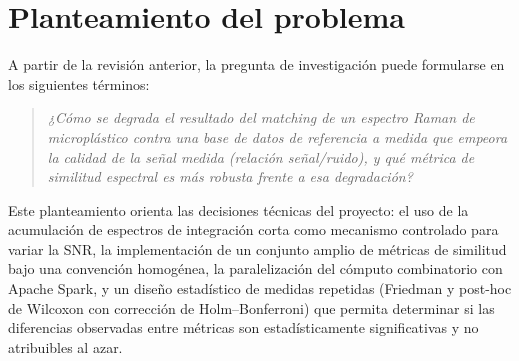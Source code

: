 \section{Planteamiento del problema}

A partir de la revisión anterior, la pregunta de investigación puede formularse en los siguientes términos:

\begin{quote}
\textit{¿Cómo se degrada el resultado del \textit{matching} de un espectro Raman de microplástico contra una base de datos de referencia a medida que empeora la calidad de la señal medida (relación señal/ruido), y qué métrica de similitud espectral es más robusta frente a esa degradación?}
\end{quote}

Este planteamiento orienta las decisiones técnicas del proyecto: el uso de la acumulación de espectros de integración corta como mecanismo controlado para variar la SNR, la implementación de un conjunto amplio de métricas de similitud bajo una convención homogénea, la paralelización del cómputo combinatorio con Apache Spark, y un diseño estadístico de medidas repetidas (Friedman y post-hoc de Wilcoxon con corrección de Holm--Bonferroni) que permita determinar si las diferencias observadas entre métricas son estadísticamente significativas y no atribuibles al azar.
